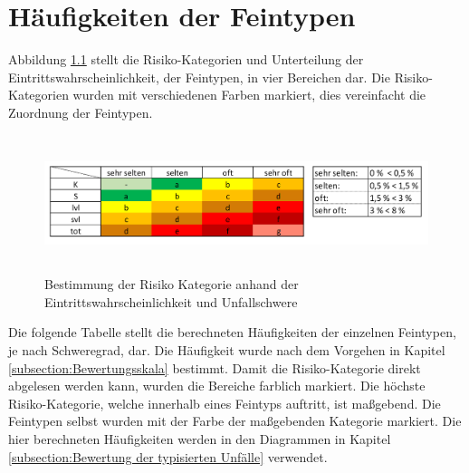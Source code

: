 
\chapter{Häufigkeiten der Feintypen}\label{chapter:Haeufigkeit_Feintypen}
Abbildung \ref{fig:Eintrittswahrscheinlichkeit} stellt die Risiko-Kategorien und Unterteilung der Eintrittswahrscheinlichkeit, der Feintypen, in vier Bereichen dar. Die Risiko-Kategorien wurden mit verschiedenen Farben markiert, dies vereinfacht die Zuordnung der Feintypen.

\begin{savenotes}
	\begin{figure}[H]
		\centering
		\includegraphics[width=16cm,height=4cm]{figures/Eintrittswahrscheinlichkeit}
		\caption[Bestimmung der Risiko-Kategorie anhand der Eintrittswahrscheinlichkeit und Unfallschwere]{Bestimmung der Risiko Kategorie anhand der Eintrittswahrscheinlichkeit und Unfallschwere}\label{fig:Eintrittswahrscheinlichkeit}
	\end{figure}
\end{savenotes}

Die folgende Tabelle stellt die berechneten Häufigkeiten der einzelnen Feintypen, je nach Schweregrad, dar. Die Häufigkeit wurde nach dem Vorgehen in Kapitel \ref{subsection:Bewertungsskala} bestimmt. Damit die Risiko-Kategorie direkt abgelesen werden kann, wurden die Bereiche farblich markiert. Die höchste Risiko-Kategorie, welche innerhalb eines Feintyps auftritt, ist maßgebend. Die Feintypen selbst wurden mit der Farbe der maßgebenden Kategorie markiert. Die hier berechneten Häufigkeiten werden in den Diagrammen in Kapitel \ref{subsection:Bewertung der typisierten Unfälle} verwendet.
  

